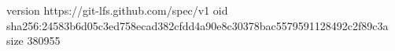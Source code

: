 version https://git-lfs.github.com/spec/v1
oid sha256:24583b6d05c3ed758ecad382cfdd4a90e8c30378bac5579591128492c2f89c3a
size 380955
